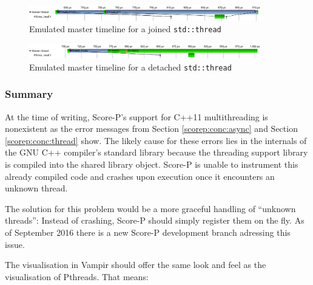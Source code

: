 \begin{figure}[htbp]
	\begin{center}
		\includegraphics[width=0.9\textwidth]{img/scorep_pthread_join_timeline.png}
		\caption{Emulated master timeline for a joined \texttt{std::thread}}
		\label{scorep:conc:pthread_join_timeline}
	\end{center}
\end{figure}

\begin{figure}[htbp]
	\begin{center}
		\includegraphics[width=0.9\textwidth]{img/scorep_pthread_detach_timeline.png}
		\caption{Emulated master timeline for a detached \texttt{std::thread}}
		\label{scorep:conc:pthread_detach_timeline}
	\end{center}
\end{figure}

\subsubsection{Summary}

At the time of writing, Score-P's support for C++11 multithreading is nonexistent as the error messages from Section \ref{scorep:conc:async} and Section \ref{scorep:conc:thread} show. The likely cause for these errors lies in the internals of the GNU C++ compiler's standard library because the threading support library is compiled into the shared library object. Score-P is unable to instrument this already compiled code and crashes upon execution once it encounters an unknown thread.

The solution for this problem would be a more graceful handling of ``unknown threads'': Instead of crashing, Score-P should simply register them on the fly. As of September 2016 there is a new Score-P development branch adressing this issue.

The visualisation in Vampir should offer the same look and feel as the visualisation of Pthreads. That means:

